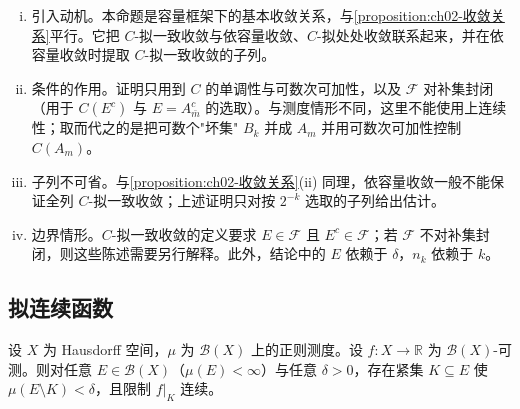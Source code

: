 \documentclass[../../main.tex]{subfiles}%
\begin{document}
\begin{remark}\label{remark:ch02-容量收敛关系}
\begin{enumerate}[(i)]
\item 引入动机。本命题是容量框架下的基本收敛关系，与\cref{proposition:ch02-收敛关系}平行。它把 $C$-拟一致收敛与依容量收敛、$C$-拟处处收敛联系起来，并在依容量收敛时提取 $C$-拟一致收敛的子列。
\item 条件的作用。证明只用到 $C$ 的单调性与可数次可加性，以及 $\mathscr F$ 对补集封闭（用于 $C(E^c)$ 与 $E=A_{\bar m}^c$ 的选取）。与测度情形不同，这里不能使用上连续性；取而代之的是把可数个"坏集" $B_k$ 并成 $A_m$ 并用可数次可加性控制 $C(A_m)$。
\item 子列不可省。与\cref{proposition:ch02-收敛关系}(ii) 同理，依容量收敛一般不能保证全列 $C$-拟一致收敛；上述证明只对按 $2^{-k}$ 选取的子列给出估计。
\item 边界情形。$C$-拟一致收敛的定义要求 $E\in\mathscr F$ 且 $E^c\in\mathscr F$；若 $\mathscr F$ 不对补集封闭，则这些陈述需要另行解释。此外，结论中的 $E$ 依赖于 $\delta$，$n_k$ 依赖于 $k$。
\end{enumerate}
\end{remark}

\subsection{拟连续函数}\label{subsection:ch02-拟连续}

\begin{theorem}[Lusin]\label{theorem:ch02-Lusin}
设 $X$ 为 Hausdorff 空间，$\mu$ 为 $\mathscr B(X)$ 上的正则测度。设 $f:X\to\mathbb{R}$ 为 $\mathscr B(X)$-可测。则对任意 $E\in\mathscr B(X)$（$\mu(E)<\infty$）与任意 $\delta>0$，存在紧集 $K\subseteq E$ 使 $\mu(E\setminus K)<\delta$，且限制 $f|_K$ 连续。
\end{theorem}
\end{document}
